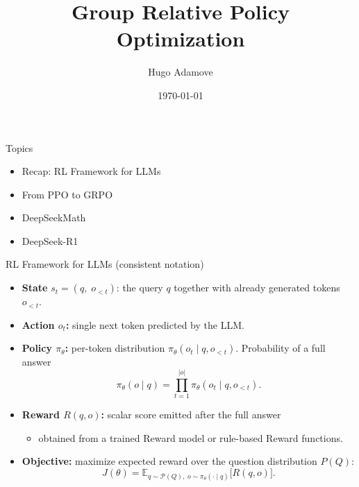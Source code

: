 \documentclass[9pt]{beamer}
\title[Group Relative Policy Optimization]{Group Relative Policy Optimization}
\author[H. Adamove]{Hugo Adamove\texorpdfstring{\\}{, }}
\institute[MU]{IV125 Formela lab seminar}
\date{\today}
\begin{document}
\frame{\titlepage}

\begin{frame}{Topics}
  \begin{itemize}
    \item Recap: RL Framework for LLMs
    \vspace{1em}
    \item From PPO to GRPO
    \vspace{1em}
    \item DeepSeekMath
    \vspace{1em}
    \item DeepSeek-R1
    \end{itemize}
\end{frame}


\begin{frame}{RL Framework for LLMs (consistent notation)}
  \begin{itemize}
    \item \textbf{State} 
          \(s_t = (q,\;o_{<t})\): the query $q$ together with already generated tokens $o_{<t}$.

    \item \textbf{Action $o_t$:} 
          single next token predicted by the LLM.

    \item \textbf{Policy $\pi_\theta$:} 
          per-token distribution  
          \(\pi_\theta(o_t \mid q, o_{<t})\).  
          Probability of a full answer  
          \[
              \pi_\theta(o \mid q)=
              \prod_{t=1}^{|o|} \pi_\theta(o_t \mid q, o_{<t}).
          \]

    \pause
    \item \textbf{Reward $R(q,o)$:} 
          scalar score emitted after the full answer  \begin{itemize}
          \item obtained from a trained Reward model or rule-based Reward functions.
\end{itemize}
    \vfill

    \pause
    \item \textbf{Objective:}  
          maximize expected reward over the question distribution $P(Q)$:
          \[
             J(\theta)=
             \mathbb{E}_{q\sim\mathcal P(Q),\;o\sim\pi_\theta(\cdot\mid q)}
             \bigl[R(q,o)\bigr].
          \]
  \end{itemize}
\end{frame}
\end{document}
